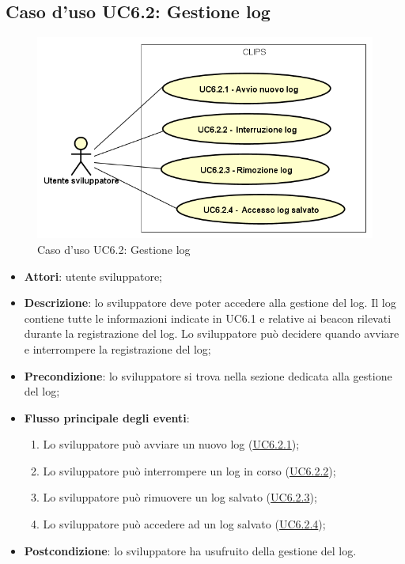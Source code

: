 \documentclass[../AnalisiDeiRequisiti.tex]{subfiles}
\begin{document}
\subsection{Caso d'uso UC6.2: Gestione log}

        \begin{figure}[!h]
            \centering
            \includegraphics[scale=0.95, width=\textwidth]{img/UC6-2.png}
            \caption{Caso d'uso UC6.2: Gestione log}\label{fig:UC6.2} 
        \end{figure}
\begin{itemize}
\item \textbf{Attori}: utente sviluppatore;
\item \textbf{Descrizione}: lo sviluppatore deve poter accedere alla gestione del log. Il log contiene tutte le informazioni indicate in UC6.1 e relative ai beacon rilevati durante la registrazione del log. Lo sviluppatore può decidere quando avviare e interrompere la registrazione del log; 
      \item \textbf{Precondizione}: lo sviluppatore si trova nella sezione dedicata alla gestione del log;

        \item \textbf{Flusso principale degli eventi}:
          \begin{enumerate}
          \item Lo sviluppatore può avviare un nuovo log (\hyperlink{UC6.2.1}{UC6.2.1});
          \item Lo sviluppatore può interrompere un log in corso (\hyperlink{UC6.2.2}{UC6.2.2});
          \item Lo sviluppatore può rimuovere un log salvato (\hyperlink{UC6.2.3}{UC6.2.3});
          \item Lo sviluppatore può accedere ad un log salvato (\hyperlink{UC6.2.4}{UC6.2.4});

      \end{enumerate}
    \item \textbf{Postcondizione}: lo sviluppatore ha usufruito della gestione del log.
  \end{itemize}
\hypertarget{UC6.2.1}{}
\end{document}
